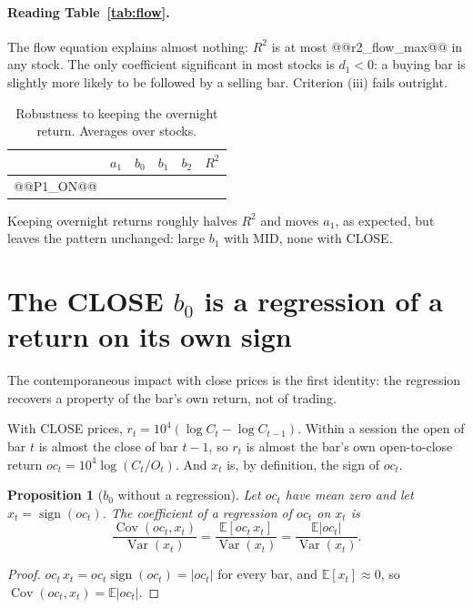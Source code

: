 \documentclass[11pt,a4paper]{article}
\newtheorem{proposition}{Proposition}
\newcommand{\E}{\mathbb{E}}
\begin{document}
\paragraph{Reading Table~\ref{tab:flow}.} The flow equation explains almost nothing: $R^2$ is at most
@@r2_flow_max@@ in any stock. The only coefficient significant in most stocks is $d_1<0$: a buying bar is
slightly more likely to be followed by a selling bar. Criterion (iii) fails outright.

\begin{table}[htbp]
\centering
\caption{Robustness to keeping the overnight return. Averages over stocks.}
\label{tab:overnight}
\small
\begin{tabular}{@{}lrrrrr@{}}
\toprule
& $a_1$ & $b_0$ & $b_1$ & $b_2$ & $R^2$ \\
\midrule
@@P1_ON@@
\bottomrule
\end{tabular}
\end{table}

Keeping overnight returns roughly halves $R^2$ and moves $a_1$, as expected, but leaves the pattern
unchanged: large $b_1$ with MID, none with CLOSE.

\section{The CLOSE $b_0$ is a regression of a return on its own sign}
\label{sec:b0}

The contemporaneous impact with close prices is the first identity: the regression recovers a property of the bar's own return, not of trading.


With CLOSE prices, $r_t = 10^4(\log C_t - \log C_{t-1})$. Within a session the open of bar $t$ is almost
the close of bar $t-1$, so $r_t$ is almost the bar's own open-to-close return $oc_t = 10^4\log(C_t/O_t)$.
And $x_t$ is, by definition, the sign of $oc_t$.

\begin{proposition}[$b_0$ without a regression]
\label{prop:b0}
Let $oc_t$ have mean zero and let $x_t=\operatorname{sign}(oc_t)$. The coefficient of a regression of
$oc_t$ on $x_t$ is
\[
\frac{\operatorname{Cov}(oc_t,x_t)}{\operatorname{Var}(x_t)} = \frac{\E[oc_t\,x_t]}{\operatorname{Var}(x_t)}
= \frac{\E|oc_t|}{\operatorname{Var}(x_t)} .
\]
\end{proposition}
\begin{proof}
$oc_t\,x_t = oc_t\operatorname{sign}(oc_t)=|oc_t|$ for every bar, and $\E[x_t]\approx0$, so
$\operatorname{Cov}(oc_t,x_t)=\E|oc_t|$.
\end{proof}
\end{document}
